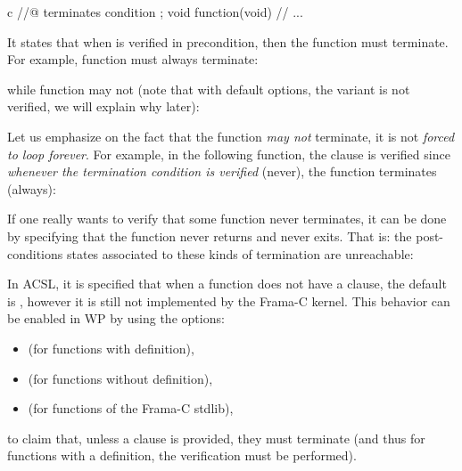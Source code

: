 \begin{CodeBlock}{c}
//@ terminates condition ;
void function(void){
  // ...
}
\end{CodeBlock}



It states that when  is verified in precondition, then
the function must terminate. For example, function  must always
terminate:






while function  may not (note that with default options,
the variant is not verified, we will explain why later):






Let us emphasize on the fact that the function {\em may not} terminate, it is
not {\em forced to loop forever}. For example, in the following function, the
 clause is verified since
{\em whenever the termination condition is verified} (never), the function
terminates (always):






\begin{Information}
  If one really wants to verify that some function never terminates, it can be
  done by specifying that the function never returns and never exits. That is:
  the post-conditions states associated to these kinds of termination are
  unreachable:
\end{Information}



\begin{Information}
  In ACSL, it is specified that when a function does not have a
   clause, the default is
  , however it is still not
  implemented by the Frama-C kernel. This behavior can be enabled in WP
  by using the options:
  \begin{itemize}
  \item {} (for functions with definition),
  \item {} (for functions without definition),
  \item {} (for functions of the Frama-C stdlib),
  \end{itemize}
  to claim that, unless a clause is provided, they must terminate (and thus
  for functions with a definition, the verification must be performed).
\end{Information}



